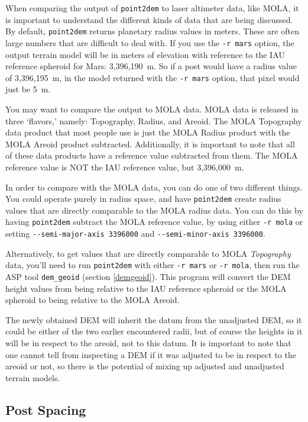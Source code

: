 When comparing the output of \texttt{point2dem} to laser altimeter
data, like MOLA, it is important to understand the different kinds
of data that are being discussed.  By default, \texttt{point2dem}
returns planetary radius values in meters.  These are often large
numbers that are difficult to deal with.  If you use the \texttt{-r
mars} option, the output terrain model will be in meters of elevation
with reference to the IAU reference spheroid for Mars: 3,396,190~m.
So if a post would have a radius value of 3,396,195~m, in the model
returned with the \texttt{-r mars} option, that pixel would just be 5~m.

You may want to compare the output to MOLA data.  MOLA data is
released in three `flavors,' namely: Topography, Radius, and Areoid.
The MOLA Topography data product that most people use is just the MOLA Radius
product with the MOLA Areoid product subtracted.  Additionally, it is
important to note that all of these data products have a reference
value subtracted from them.  The MOLA reference value is NOT the
IAU reference value, but 3,396,000~m.

In order to compare with the MOLA data, you can do one of two different
things.  You could operate purely in radius space, and have
\texttt{point2dem} create radius values that are directly comparable to
the MOLA radius data.  You can do this by having \texttt{point2dem}
subtract the MOLA reference value, by using either \texttt{-r
mola} or setting \texttt{-\/-semi-major-axis 3396000} and
\texttt{-\/-semi-minor-axis 3396000}.

Alternatively, to get values that are directly comparable to MOLA
\textit{Topography} data, you'll need to run \texttt{point2dem} with
either \texttt{-r mars} or \texttt{-r mola}, then run the ASP tool
\texttt{dem\_geoid} (section \ref{demgeoid}). This program will convert
the DEM height values from being relative to the IAU reference spheroid
or the MOLA spheroid to being relative to the MOLA Areoid.

The newly obtained DEM will inherit the datum from the unadjusted DEM,
so it could be either of the two earlier encountered radii, but of
course the heights in it will be in respect to the areoid, not to this
datum. It is important to note that one cannot tell from inspecting a
DEM if it was adjusted to be in respect to the areoid or not, so there is
the potential of mixing up adjusted and unadjusted terrain models.

\subsection{Post Spacing}
\label{post-spacing}

